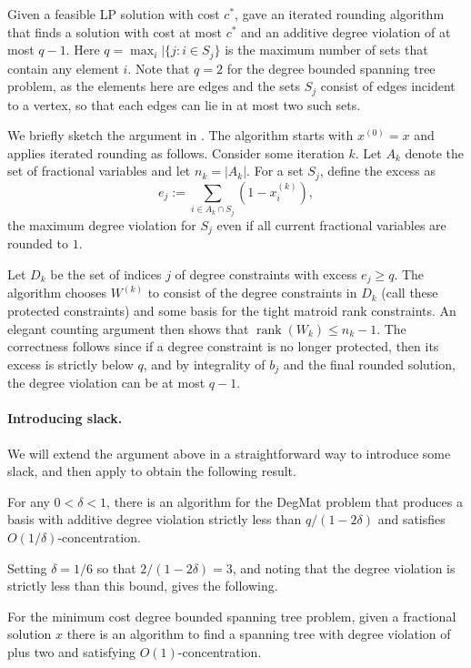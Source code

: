 \documentclass{toc}
\newcommand{\rank}{\operatorname{rank}}
\begin{document}
Given a feasible LP solution with cost $c^*$,
\cite{KLS08,BKN09} gave an iterated rounding algorithm that finds a solution with cost at most $c^*$ and an additive degree violation of at most $q-1$.
Here $q = \max_i |\{j: i\in S_j\}$  is the maximum number of sets that contain any element $i$. Note that $q=2$ for
the degree bounded spanning tree problem, as the elements here are edges and the sets $S_j$ consist of edges incident to a vertex, so that each edges can lie in at most two such sets.

We briefly sketch the argument in \cite{KLS08,BKN09}. The algorithm starts with $x^{(0)}=x$ and applies iterated rounding as follows.
Consider some iteration $k$. Let $A_k$ denote the set of fractional variables and let $n_k=|A_k|$. For a set $S_j$, define the excess as
\begin{equation}
\label{eq:excess2} e_j:= \sum_{i \in A_k \cap S_j} (1-x^{(k)}_{i}),
\end{equation}
the maximum degree violation for $S_j$ even if all current fractional variables are rounded to $1$.

Let $D_k$ be the set of indices $j$ of degree constraints with excess $e_j \geq q$.
The algorithm chooses $W^{(k)}$ to consist of the degree constraints in $D_k$ (call these protected constraints) and some basis for the tight matroid rank constraints.
An elegant counting argument then shows that $\rank(W_k) \leq n_k-1$. The correctness follows since if a degree constraint is no longer protected, then its excess is strictly below $q$, and by integrality of $b_j$ and the final rounded solution, the degree violation can be at most $q-1$.

\paragraph{Introducing slack.} We will extend the argument above in a straightforward way to introduce some slack, and then apply  to obtain the following result.
\begin{theorem} For any $0 < \delta < 1$, there is  an algorithm for the DegMat problem that produces a basis with additive degree violation strictly less than $q/(1-2\delta)$ and satisfies $O(1/\delta)$-concentration.
\end{theorem}
Setting $\delta = 1/6$ so that $2/(1-2\delta) = 3$, and noting that the degree violation is strictly less than this bound, gives the following.
\begin{corollary}
For the minimum cost degree bounded spanning tree problem, given a fractional solution $x$ there is an algorithm to find a spanning tree with degree violation of plus two and satisfying $O(1)$-concentration.
\end{corollary}
\end{document}
